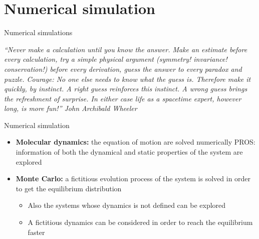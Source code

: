 \documentclass{beamer}
\begin{document}
\section{Numerical simulation}

\begin{frame}{}
\begin{center}
{\Huge Numerical simulations}
\end{center}
\begin{center}
\textit{“Never make a calculation until you know the answer. Make an estimate before every calculation, try a simple physical argument (symmetry! invariance! conservation!) before every derivation, guess the answer to every paradox and puzzle. Courage: No one else needs to know what the guess is. Therefore make it quickly, by instinct. A right guess reinforces this instinct. A wrong guess brings the refreshment of surprise. In either case life as a spacetime expert, however long, is more fun!” John Archibald Wheeler }
\end{center}
\end{frame}


\begin{frame}{Numerical simulation \cite{peliti2011statistical}}
\begin{itemize}
\item\textbf{Molecular dynamics:} the equation of motion are solved numerically PROS: information of both the dynamical and static properties of the system are explored 
\item\textbf{Monte Carlo:} a fictitious evolution process of the system is solved in order to get the equilibrium distribution
  \begin{itemize}
  \item Also the systems whose dynamics is not defined can be explored
  \item A fictitious dynamics can be considered in order to reach the equilibrium faster 
  \end{itemize} 
\end{itemize}
\end{frame}
\end{document}
